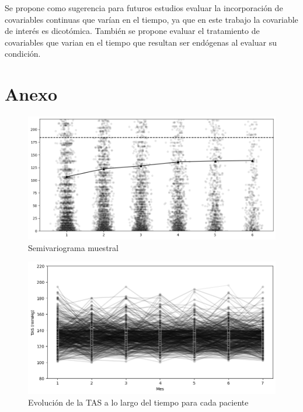 \documentclass[spanish]{article}
\numberwithin{figure}{subsection}
\numberwithin{equation}{subsection}
\numberwithin{table}{subsection}
\begin{document}
Se propone como sugerencia para futuros estudios evaluar la incorporación de
covariables continuas que varían en el tiempo, ya que en este trabajo la
covariable de interés es dicotómica. También se propone evaluar el tratamiento
de covariables que varian en el tiempo que resultan ser endógenas al evaluar su
condición.

\newpage

\section{Anexo}

\begin{figure}[H]
	\centering
	\includegraphics[scale=0.4]{img/semivariogram.png}
	\caption{Semivariograma muestral}
	\label{semivariogram}
\end{figure}

\begin{figure}[H]
	\centering
	\includegraphics[scale=0.5]{img/TAS_vs_tpo_perfiles_individuales.png}
	\caption{Evolución de la TAS a lo largo del tiempo para cada paciente}
	\label{perfiles_individuales}
\end{figure}


\newpage
\nocite{*}
\renewcommand{\refname}{Bibliografía}

\end{document}
